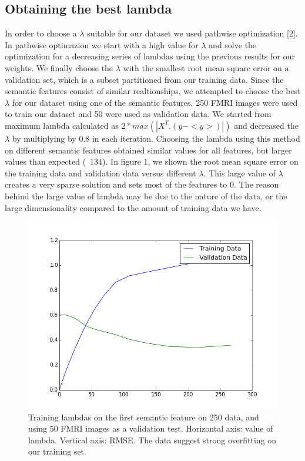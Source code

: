 \documentclass{article} %
\begin{document}
\subsection{Obtaining the best lambda}
In order to choose a $\lambda$ suitable for our dataset we used pathwise optimization [2]. In pathwise optimazion we start with a high value for  $\lambda$ and solve the optimization for a decreasing series of lambdas using the previous results for our weights. We finally choose the $\lambda$ with the smallest root mean square error on a validation set, which is a subset partitioned from our training data. Since the semantic features consist of similar realtionships, we attempted to choose the best $\lambda$ for our dataset using one of the semantic features. 250 FMRI images were used to train our dataset and 50 were used as validation data. We started from maximum lambda calculated as $2 * max (|X^T.(y - <y>)|)$ and decreased the $\lambda$ by multiplying by 0.8 in each iteration. Choosing the lambda using this method on different semantic features obtained similar values for all features, but larger values than expected (~134). In figure 1, we shown the root mean square error on the training data and validation data versus different $\lambda$. This large value of $\lambda$ creates a very sparse solution and sets most of the features to 0. The reason behind the large value of lambda may be due to the nature of the data, or the large dimensionality compared to the amount of training data we have.



\begin{figure}[h]
\begin{center}
\includegraphics[scale=0.5]{trainvalidlambda}
\end{center}
\caption{Training lambdas on the first semantic feature on 250 data, and using 50 FMRI
images as a validation test. Horizontal axis: value of lambda. Vertical axis: RMSE. The data suggest strong overfitting on our training set.}
\end{figure}
\end{document}
